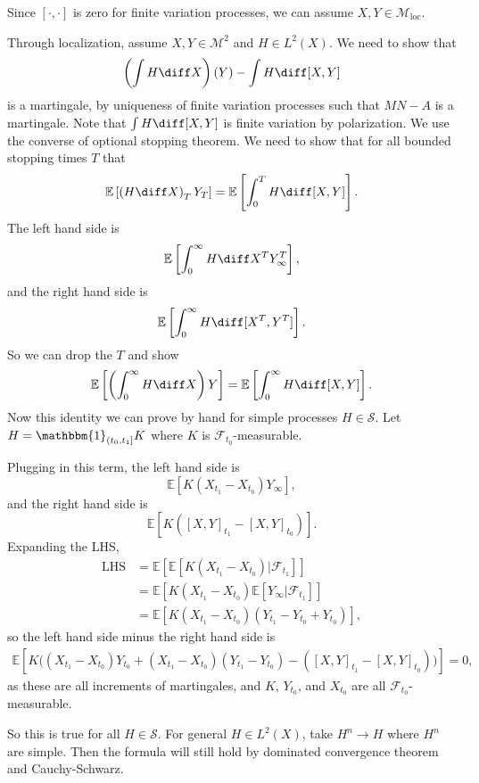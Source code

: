 \documentclass[12pt]{article}
\begin{document}
\begin{proofbox}
	Since $[\cdot, \cdot]$ is zero for finite variation processes, we can assume $X, Y \in \mathcal{M}_{\mathrm{loc}}$.

	Through localization, assume $X, Y \in \mathcal{M}^2$ and $H \in L^2(X)$. We need to show that
	\[
		\left( \int H \diff X \right)(Y) - \int H \diff [X, Y]
	\]
	is a martingale, by uniqueness of finite variation processes such that $MN - A$ is a martingale. Note that $\int H \diff [X, Y]$ is finite variation by polarization. We use the converse of optional stopping theorem. We need to show that for all bounded stopping times $T$ that
	\[
		\mathbb{E}\left[ \left( H \diff X \right)_T Y_T \right] = \mathbb{E}\left[ \int_0^T H \diff [X, Y] \right].
	\]
	The left hand side is
	\[
	\mathbb{E}\left[ \int_0^{\infty} H \diff X^{T} Y^{T}_\infty\right],
	\]
	and the right hand side is
	\[
		\mathbb{E}\left[ \int_0^{\infty} H \diff [X^T, Y^T] \right].
	\]
	So we can drop the $T$ and show
	\[
		\mathbb{E}\left[ \left( \int_0^{\infty} H \diff X \right) Y \right] = \mathbb{E}\left[\int_0^{\infty} H \diff [X, Y]\right].
	\]
	Now this identity we can prove by hand for simple processes $H \in \mathcal{S}$. Let $H = \mathbbm{1}_{(t_0, t_1]} K$ where $K$ is $\mathcal{F}_{t_0}$-measurable.

	Plugging in this term, the left hand side is
	\[
	\mathbb{E}[K(X_{t_1} - X_{t_0}) Y_\infty],
	\]
	and the right hand side is
	\[
		\mathbb{E}[K([X, Y]_{t_1} - [X, Y]_{t_0})].
	\]
	Expanding the LHS,
	\begin{align*}
		\text{LHS} &= \mathbb{E}[\mathbb{E}[K (X_{t_1} - X_{t_0})|\mathcal{F}_{t_1}]] \\
			   &= \mathbb{E}[K(X_{t_1} - X_{t_0}) \mathbb{E}[Y_\infty | \mathcal{F}_{t_1}]] \\
			   &= \mathbb{E}[K(X_{t_1} - X_{t_0})(Y_{t_1} - Y_{t_0} + Y_{t_0})],
	\end{align*}
	so the left hand side minus the right hand side is
	\begin{align*}
		\mathbb{E}\left[K \bigl( (X_{t_1} - X_{t_0})Y_{t_0} + (X_{t_1} - X_{t_0})(Y_{t_1} - Y_{t_0}) - ([X, Y]_{t_1} - [X, Y]_{t_0}) \bigr) \right] = 0,
	\end{align*}
	as these are all increments of martingales, and $K$, $Y_{t_0}$, and $X_{t_0}$ are all $\mathcal{F}_{t_0}$-measurable.

	So this is true for all $H \in \mathcal{S}$. For general $H \in L^2(X)$, take $H^{n} \to H$ where $H^{n}$ are simple. Then the formula will still hold by dominated convergence theorem and Cauchy-Schwarz.
\end{proofbox}
\end{document}
